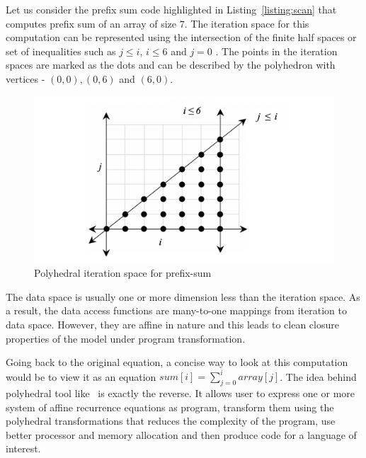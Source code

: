 Let us consider the prefix sum code highlighted in Listing~\ref{listing:scan}   that computes prefix sum of an array of size $7$. The iteration space for this computation can be represented using the intersection of the finite half spaces or set of inequalities such as $j \leq i$,  $i \leq 6$  and $j = 0$ .  The points in the iteration spaces are marked as the dots and can be described by the polyhedron with vertices - $(0, 0), (0, 6)$ and $(6, 0)$.
\begin{figure}[htbp]
\begin{adjustbox}{varwidth=\textwidth,margin=0 {\abovecaptionskip} 0 0, frame=0.00pt}
\centerline{\includegraphics[scale=.48]{iteration_space.png}}
\end{adjustbox}
\caption{Polyhedral iteration space for prefix-sum}
\label{fig}
\end{figure}
The data space is usually one or more dimension less than the iteration space. As a result, the data access functions are many-to-one mappings from iteration to data space. However, they are affine in nature and this leads to clean closure properties of the model under program transformation. 

Going back to the original equation, a concise way to look at this computation would be to view it as an equation $\displaystyle sum[i] = \sum_{j=0}^{i}array[j]$.  The idea behind polyhedral tool like \alphaz\ is exactly the reverse. It allows user to express one or more system of affine recurrence equations as program, transform them using the polyhedral transformations that reduces the complexity of the program, use better processor and memory allocation and then produce code for a language of interest.

